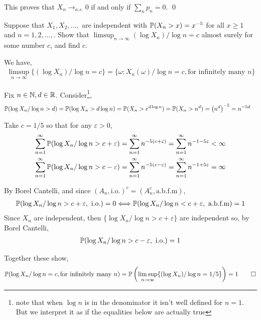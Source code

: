 \documentclass[10pt]{article}
\begin{document}
\begin{solution}
\begin{enumerate}
        This proves that \( X_n \to_{a.s.}0  \) if and only if \( \sum_n p_n = 0 \). \qed



\end{enumerate}


\end{solution}

\begin{problem}[Exercise 6.7]
    Suppose that \( X_1, X_2, ..., \) are independent with \( \mathbb{P}(X_n > x) = x^{-5} \) for all \( x\geq 1 \) and \( n=1,2,..., \). Show that \( \limsup_{n\to\infty}(\log X_n)/\log n = c \) almost surely for some number \( c \), and find \( c \).
\end{problem}

\begin{solution}

We have,
\begin{align*}
    \limsup_{n\to\infty} \{ (\log X_n)/\log n = c \} = \{ \omega : X_n(\omega)/\log n = c, \text{for infinitely many }n \}
\end{align*}

Fix \( n \in \mathbb{N}, d \in \mathbb{R}\). Consider\footnote{note that when \( \log n \) is in the denominator it isn't well defined for \( n=1 \). But we interpret it as if the equalities below are actually true},
\begin{align*}
    \mathbb{P}(\log X_n / \log n > d) &= \mathbb{P}( \log X_n > d \log n ) 
    = \mathbb{P}(X_n > e^{d\log n}) 
    = \mathbb{P}(X_n > n^{d} )
    = \left( n^d \right)^{-5}
    = n^{-5d}
\end{align*}

Take \( c=1/5 \) so that for any \( \varepsilon > 0 \),
\begin{align*}
    \sum_{n=1}^{\infty}\mathbb{P}(\log X_n /\log n > c + \varepsilon ) &= \sum_{n=1}^{\infty} n^{-5(c+\varepsilon)} = \sum_{n=1}^{\infty} n^{-1-5\varepsilon}< \infty \\
    \sum_{n=1}^{\infty}\mathbb{P}(\log X_n /\log n > c - \varepsilon ) &= \sum_{n=1}^{\infty} n^{-5(c-\varepsilon)} = \sum_{n=1}^{\infty} n^{-1+5\varepsilon} = \infty
\end{align*}

By Borel Cantelli, and since \( (A_n, \text{i.o.})^c = (A_n^c, \text{a.b.f.m})  \),
\begin{align*}
    \mathbb{P}( \log X_n / \log n > c+\varepsilon, \text{ i.o.}) = 0 
    \Longleftrightarrow \mathbb{P}( \log X_n / \log n < c+\varepsilon, \text{ a.b.f.m}) = 1 
\end{align*}
Since \( X_n \) are independent, then \( \{ \log X_n /\log n > c+\varepsilon\} \) are independent so, by Borel Cantelli,
\begin{align*}
    \mathbb{P}( \log X_n / \log n > c-\varepsilon, \text{ i.o.}) = 1
\end{align*}

Together these show,
\begin{align*}
    \PP(\log X_n/\log n = c, \text{for infinitely many }n)
    =\PP\left(\limsup_{n\to\infty}\{(\log X_n)/\log n = 1/5 \}\right) = 1 \tag*{\qed}
\end{align*}

\end{solution}
\end{document}
